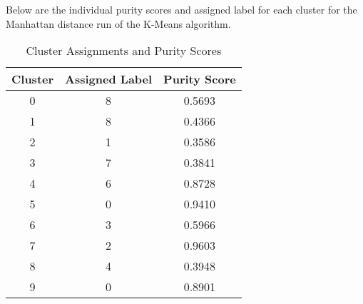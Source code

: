\documentclass[twoside,10pt]{article}
\begin{document}
Below are the individual purity scores and assigned label for each cluster for the Manhattan distance
run of the K-Means algorithm.


\begin{table}[h!]
\centering
\begin{tabular}{|c|c|c|}
\hline
\textbf{Cluster} & \textbf{Assigned Label} & \textbf{Purity Score} \\
\hline
0 & 8 & 0.5693 \\
1 & 8 & 0.4366 \\
2 & 1 & 0.3586 \\
3 & 7 & 0.3841 \\
4 & 6 & 0.8728 \\
5 & 0 & 0.9410 \\
6 & 3 & 0.5966 \\
7 & 2 & 0.9603 \\
8 & 4 & 0.3948 \\
9 & 0 & 0.8901 \\
\hline
\end{tabular}
\caption{Cluster Assignments and Purity Scores}
\label{tab:cluster_purity}
\end{table}
\end{document}
